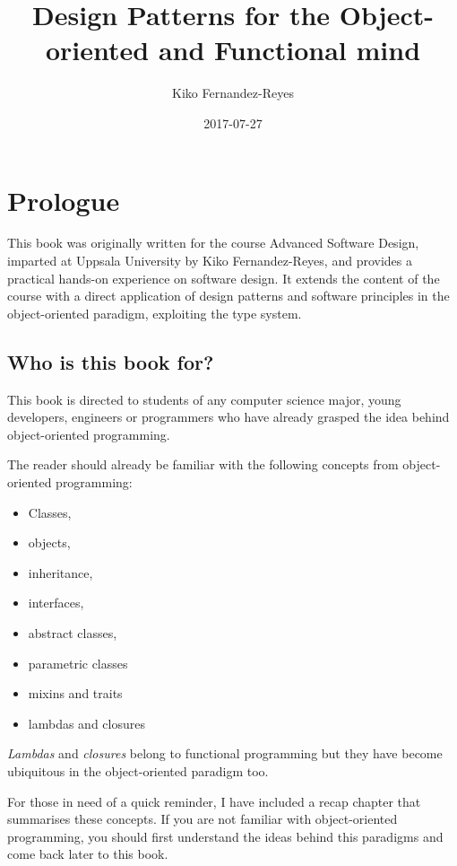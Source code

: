 \documentclass[]{article}
\title{Design Patterns for the Object-oriented and Functional mind}
\author{Kiko Fernandez-Reyes}
\date{2017-07-27}
\providecommand{\tightlist}{%
  \setlength{\itemsep}{0pt}\setlength{\parskip}{0pt}}
\begin{document}
\maketitle

{
\setcounter{tocdepth}{2}
\tableofcontents
}
\section{Prologue}\label{prologue}

This book was originally written for the course Advanced Software
Design, imparted at Uppsala University by Kiko Fernandez-Reyes, and
provides a practical hands-on experience on software design. It extends
the content of the course with a direct application of design patterns
and software principles in the object-oriented paradigm, exploiting the
type system.

\subsection{Who is this book for?}\label{who-is-this-book-for}

This book is directed to students of any computer science major, young
developers, engineers or programmers who have already grasped the idea
behind object-oriented programming.

The reader should already be familiar with the following concepts from
object-oriented programming:

\begin{itemize}
\tightlist
\item
  Classes,
\item
  objects,
\item
  inheritance,
\item
  interfaces,
\item
  abstract classes,
\item
  parametric classes
\item
  mixins and traits
\item
  lambdas and closures
\end{itemize}

\emph{Lambdas} and \emph{closures} belong to functional programming but
they have become ubiquitous in the object-oriented paradigm too.

For those in need of a quick reminder, I have included a recap chapter
that summarises these concepts. If you are not familiar with
object-oriented programming, you should first understand the ideas
behind this paradigms and come back later to this book.
\end{document}
